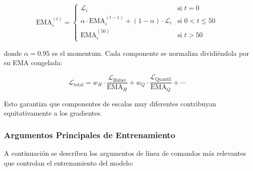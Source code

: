 \begin{equation}
\text{EMA}_i^{(t)} = \begin{cases}
\mathcal{L}_i & \text{si } t = 0 \\
\alpha \cdot \text{EMA}_i^{(t-1)} + (1 - \alpha) \cdot \mathcal{L}_i & \text{si } 0 < t \leq 50 \\
\text{EMA}_i^{(50)} & \text{si } t > 50
\end{cases}
\end{equation}

donde $\alpha = 0.95$ es el momentum. Cada componente se normaliza dividiéndola por su EMA congelada:

\begin{equation}
\mathcal{L}_{\text{total}} = w_H \cdot \frac{\mathcal{L}_{\text{Huber}}}{\text{EMA}_H} + w_Q \cdot \frac{\mathcal{L}_{\text{Quantil}}}{\text{EMA}_Q} + \cdots
\end{equation}

Esto garantiza que componentes de escalas muy diferentes contribuyan equitativamente a los gradientes.

\subsubsection{Argumentos Principales de Entrenamiento}

A continuación se describen los argumentos de línea de comandos más relevantes que controlan el entrenamiento del modelo:

